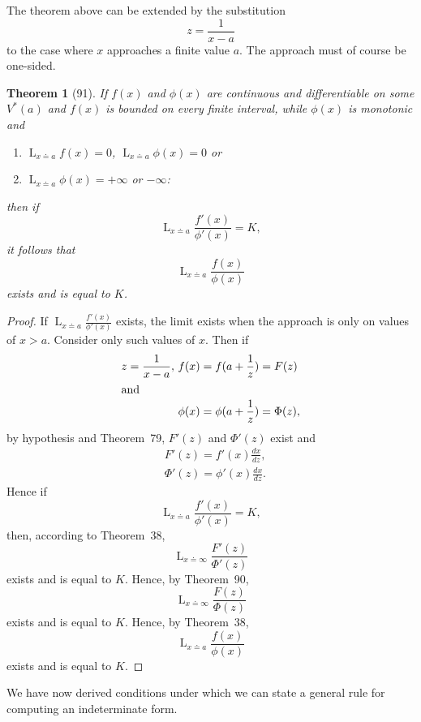 \documentclass[a4paper,12pt]{book}[2004/02/16]
\providecommand{\colorbox}[2]{#2}
\newcommand{\correction}[2]{\colorbox{corr}{#1}}
\providecommand{\hyperlink}[2]{#2}
\providecommand{\hypertarget}[2]{#2}
\theoremstyle{ilemma}
\theoremstyle{itheorem}
\newtheorem{theorem}{Theorem}
\theoremstyle{iother}
\theoremstyle{icorollary}
\theoremstyle{numcorollary}
\theoremstyle{idefinition}
\begin{document}
The theorem above can be extended by the substitution
\[
  z=\frac{1}{x-a}
\]
to the case where $x$ approaches a finite value $a$. The approach must
of course be one-sided.

\begin{theorem}[91]\hypertarget{thm91}{}
If $f(x)$ and $\phi(x)$ are continuous and differentiable on some
$V^*(a)$ and $f(x)$ is bounded on every finite interval, while
$\phi(x)$ is monotonic and
\begin{enumerate}
\item[\textnormal{(1)}] $\displaystyle \mathop{L}_{x \doteq a} f(x)=0$,
$\displaystyle \mathop{L}_{\text{\correction{$x\doteq a$}{$x=a$}}} \phi(x)=0$  or

\item[\textnormal{(2)}] $\displaystyle \mathop{L}_{\text{\correction{$x\doteq a$}{$x=a$}}} \phi(x)=+\infty$
or  $-\infty$:
\end{enumerate}
then if
\[
  \mathop{L}_{x \doteq a} \frac{f'(x)}{\phi'(x)}=K,
\]
it follows that
\[
  \mathop{L}_{x \doteq a} \frac{f(x)}{\phi(x)}
\]
exists and is equal to $K$.
\end{theorem}

\begin{proof}
If $\displaystyle \mathop{L}_{x\doteq a} \frac{f'(x)}{\phi'(x)}$
exists, the limit exists when the approach is only on values of
$x>a$. Consider only such values of $x$. Then if
\begin{align*}
  z=\frac{1}{x-a},\ &f(x)=f(a+\frac1z)=F(z)
\\
\intertext{and}
  &\phi(x) = \phi(a+\frac1z) = \Phi(z),
\end{align*}
by hypothesis and Theorem~\hyperlink{thm79}{79}, $F'(z)$ and $\Phi'(z)$ exist and
\begin{align*}
  &F'(z) = f'(x)\frac{dx}{dz}, \\
  &\Phi'(z)=\phi'(x)\frac{dx}{dz}.
\end{align*}
Hence if
\[
  \mathop{L}_{x\doteq a} \frac{f'(x)}{\phi'(x)}=K,
\]
then, according to Theorem~\hyperlink{thm38}{38},
\[
  \mathop{L}_{x\doteq \infty} \frac{F'(z)}{\Phi'(z)}
\]
exists and is equal to $K$.
Hence, by Theorem~\hyperlink{thm90}{90},
\[
  \mathop{L}_{x\doteq \infty} \frac{F(z)}{\Phi(z)}
\]
exists and is equal to $K$.
Hence, by Theorem~\hyperlink{thm38}{38},
\[
  \mathop{L}_{x\doteq a} \frac{f(x)}{\phi(x)}
\]
exists and is equal to $K$.
\end{proof}

We have now derived conditions under which we can state a general rule
for computing an indeterminate form.
\end{document}
